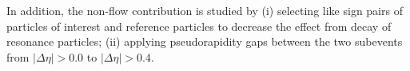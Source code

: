 In addition, the non-flow contribution is studied by (i) selecting like sign pairs of particles of interest and reference particles to decrease the effect from decay of resonance particles; (ii) applying pseudorapidity gaps between the two subevents from $|\Delta\eta|>0.0$ to $|\Delta\eta|>0.4$.





